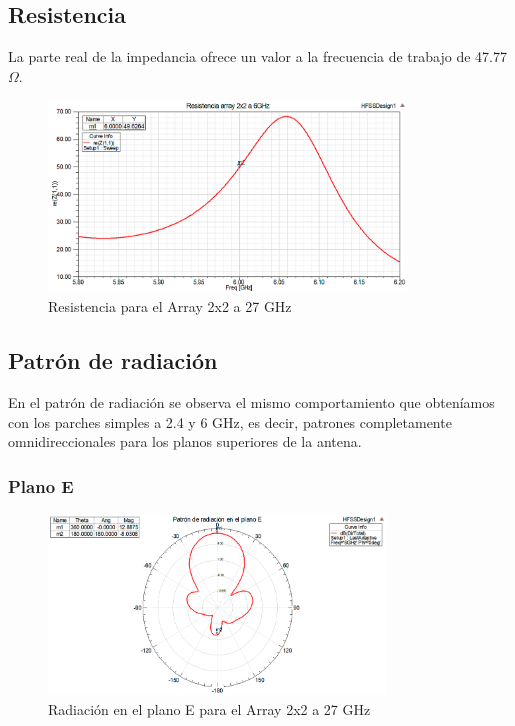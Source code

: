\subsection{Resistencia}
\par La parte real de la impedancia ofrece un valor a la frecuencia de trabajo de 47.77 $\Omega$.
\\
\begin{figure}[H]
    \centering
        \includegraphics[width=0.85\textwidth]{archivos/analisis/2x23/3}
        \caption{Resistencia para el Array 2x2 a 27 GHz}
        \label{fig:resis2x23}
\end{figure}


\subsection{Patrón de radiación}
\par En el patrón de radiación se observa el mismo comportamiento que obteníamos con los parches simples a 2.4 y 6 GHz, es decir, patrones completamente omnidireccionales para los planos superiores de la antena.
\\
\subsubsection{Plano E}
\begin{figure}[H]
    \centering
        \includegraphics[width=0.8\textwidth]{archivos/analisis/2x23/4}
        \caption{Radiación en el plano E para el Array 2x2 a 27 GHz}
        \label{fig:E2x23}
\end{figure}

